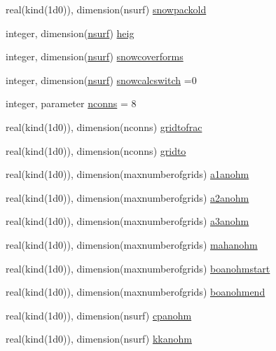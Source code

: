\begin{DoxyCompactItemize}
real(kind(1d0)), dimension(nsurf) \hyperlink{namespaceallocatearray_a57efc99803853059b05e3ad2f8c7b369}{snowpackold}
\item 
integer, dimension(\hyperlink{namespaceallocatearray_acd22f92a06f7e9a2a91426b3dc99fdb0}{nsurf}) \hyperlink{namespaceallocatearray_a0d080c680eb400a8742276b57c625224}{heig}
\item 
integer, dimension(\hyperlink{namespaceallocatearray_acd22f92a06f7e9a2a91426b3dc99fdb0}{nsurf}) \hyperlink{namespaceallocatearray_aa5bce865502bab8845c8ce638efee764}{snowcoverforms}
\item 
integer, dimension(\hyperlink{namespaceallocatearray_acd22f92a06f7e9a2a91426b3dc99fdb0}{nsurf}) \hyperlink{namespaceallocatearray_ae1fb990049408fe1fa4f557577937ed6}{snowcalcswitch} =0
\item 
integer, parameter \hyperlink{namespaceallocatearray_a420c0415ef0d070ce0b1c598ace0b0a4}{nconns} = 8
\item 
real(kind(1d0)), dimension(nconns) \hyperlink{namespaceallocatearray_a07eae9a32f308646702ed56a2d5c345a}{gridtofrac}
\item 
real(kind(1d0)), dimension(nconns) \hyperlink{namespaceallocatearray_a48e0ebcd7ec31deaddaf32352c02e180}{gridto}
\item 
real(kind(1d0)), dimension(maxnumberofgrids) \hyperlink{namespaceallocatearray_a9f0b71fb7110ca245554e33daaead7b9}{a1anohm}
\item 
real(kind(1d0)), dimension(maxnumberofgrids) \hyperlink{namespaceallocatearray_a4e8efd0e638a21f7639966960c6464cd}{a2anohm}
\item 
real(kind(1d0)), dimension(maxnumberofgrids) \hyperlink{namespaceallocatearray_ae979608ee97f9eb1ab20cfd2bef838db}{a3anohm}
\item 
real(kind(1d0)), dimension(maxnumberofgrids) \hyperlink{namespaceallocatearray_afab50b58dfb4bad7d0078ba26cfabb41}{mahanohm}
\item 
real(kind(1d0)), dimension(maxnumberofgrids) \hyperlink{namespaceallocatearray_a2f2000b6fe2d48ee6df98331bd186501}{boanohmstart}
\item 
real(kind(1d0)), dimension(maxnumberofgrids) \hyperlink{namespaceallocatearray_a69fef98bd89eb5bb96f19caf0e300cb2}{boanohmend}
\item 
real(kind(1d0)), dimension(nsurf) \hyperlink{namespaceallocatearray_a24bcde513a65db1cd23573a243901f6a}{cpanohm}
\item 
real(kind(1d0)), dimension(nsurf) \hyperlink{namespaceallocatearray_a8055e207eb40afdc658bde6493ab319e}{kkanohm}

\end{DoxyCompactItemize}
